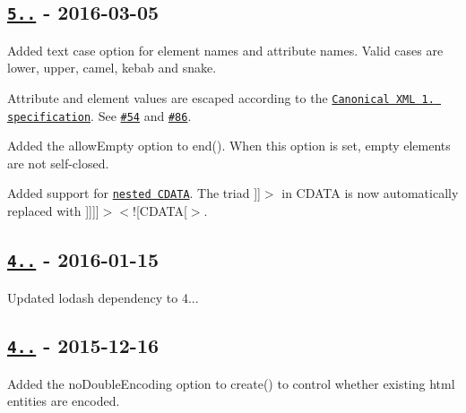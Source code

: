 \subsection*{\href{https://github.com/oozcitak/xmlbuilder-js/compare/v4.2.1...v5.0.0}{\tt 5..} -\/ 2016-\/03-\/05}


\begin{DoxyItemize}
\item Added text case option for element names and attribute names. Valid cases are {\ttfamily lower}, {\ttfamily upper}, {\ttfamily camel}, {\ttfamily kebab} and {\ttfamily snake}.
\item Attribute and element values are escaped according to the \href{http://www.w3.org/TR/2000/WD-xml-c14n-20000119.html#charescaping}{\tt Canonical X\+ML 1. specification}. See \href{https://github.com/oozcitak/xmlbuilder-js/issues/54}{\tt \#54} and \href{https://github.com/oozcitak/xmlbuilder-js/issues/86}{\tt \#86}.
\item Added the {\ttfamily allow\+Empty} option to {\ttfamily end()}. When this option is set, empty elements are not self-\/closed.
\item Added support for \href{https://en.wikipedia.org/wiki/CDATA#Nesting}{\tt nested C\+D\+A\+TA}. The triad {\ttfamily \mbox{]}\mbox{]}$>$} in C\+D\+A\+TA is now automatically replaced with {\ttfamily \mbox{]}\mbox{]}\mbox{]}\mbox{]}$>$$<$!\mbox{[}C\+D\+A\+TA\mbox{[}$>$}.
\end{DoxyItemize}

\subsection*{\href{https://github.com/oozcitak/xmlbuilder-js/compare/v4.2.0...v4.2.1}{\tt 4..} -\/ 2016-\/01-\/15}


\begin{DoxyItemize}
\item Updated lodash dependency to 4...
\end{DoxyItemize}

\subsection*{\href{https://github.com/oozcitak/xmlbuilder-js/compare/v4.1.0...v4.2.0}{\tt 4..} -\/ 2015-\/12-\/16}


\begin{DoxyItemize}
\item Added the {\ttfamily no\+Double\+Encoding} option to {\ttfamily create()} to control whether existing html entities are encoded.
\end{DoxyItemize}

